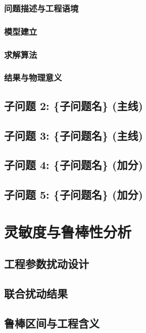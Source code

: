 \documentclass[12pt,a4paper]{ctexart}
\begin{document}
\subsubsection{问题描述与工程语境}
\subsubsection{模型建立}
\subsubsection{求解算法}
\subsubsection{结果与物理意义}

\subsection{子问题 2: \{子问题名\} (主线)}

\subsection{子问题 3: \{子问题名\} (主线)}

\subsection{子问题 4: \{子问题名\} (加分)}

\subsection{子问题 5: \{子问题名\} (加分)}


\section{灵敏度与鲁棒性分析}

\subsection{工程参数扰动设计}

\subsection{联合扰动结果}

\subsection{鲁棒区间与工程含义}
\end{document}
